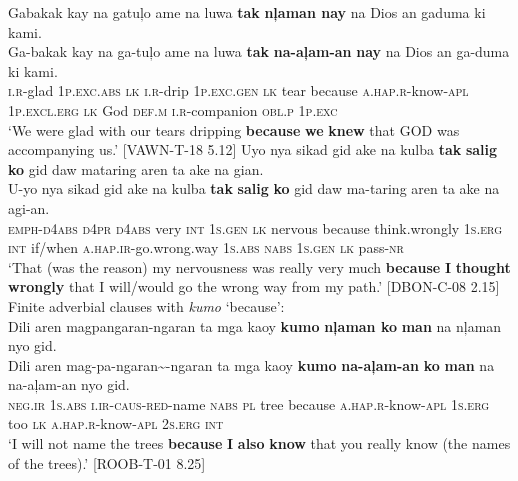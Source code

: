 \newpage
\ea
Gabakak  kay  na  gatuļo  ame  na  luwa  \textbf{tak} \textbf{nļaman  nay} na  Dios  an  gaduma  ki  kami. \smallskip\\
\gll Ga-bakak  kay  na  ga-tuļo  ame  na  luwa  \textbf{tak} \textbf{na-aļam-an}  \textbf{nay} na  Dios  an  ga-duma  ki  kami. \\
\textsc{i.r}-glad  1\textsc{p.exc.abs}  \textsc{lk}  \textsc{i.r}-drip  1\textsc{p.exc.gen}  \textsc{lk}  tear  because
\textsc{a.hap.r}-know-\textsc{apl}  1\textsc{p.excl.erg}  \textsc{lk}  God  \textsc{def.m}  \textsc{i.r}-companion  \textsc{obl.p}  1\textsc{p.exc} \\
\glt `We were glad with our tears dripping \textbf{because} \textbf{we} \textbf{knew} that GOD was accompanying us.’ [VAWN-T-18 5.12]
\z
\ea
Uyo   nya  sikad  gid  ake  na  kulba  \textbf{tak}  \textbf{salig} \textbf{ko}  gid  daw  mataring  aren  ta  ake  na  gian. \smallskip\\
\gll U-yo   nya  sikad  gid  ake  na  kulba  \textbf{tak}  \textbf{salig} \textbf{ko}  gid  daw  ma-taring  aren  ta  ake  na  agi-an. \\
\textsc{emph-d4abs} \textsc{d4pr}  \textsc{d}4\textsc{abs}  very  \textsc{int}  1\textsc{s.gen}  \textsc{lk}  nervous  because  think.wrongly
1\textsc{s.erg}  \textsc{int}  if/when  \textsc{a.hap.ir}-go.wrong.way  1\textsc{s.abs}  \textsc{nabs}  1\textsc{s.gen}  \textsc{lk}  pass-\textsc{nr} \\
\glt `That (was the reason) my nervousness was really very much \textbf{because} \textbf{I} \textbf{thought} \textbf{wrongly} that I will/would go the wrong way from my path.’ [DBON-C-08 2.15]
\z
\ea
Finite adverbial clauses with \textit{kumo} ‘because’: \\
Dili  aren  magpangaran-ngaran  ta  mga  kaoy \textbf{kumo}  \textbf{nļaman  ko}  \textbf{man}  na  nļaman  nyo  gid. \smallskip\\
\gll Dili  aren  mag-pa-ngaran\sim{}-ngaran  ta  mga  kaoy \textbf{kumo}  \textbf{na-aļam-an}  \textbf{ko}  \textbf{man}  na  na-aļam-an  nyo  gid. \\
\textsc{neg.ir}  1\textsc{s.abs}  \textsc{i.ir}-\textsc{caus}-\textsc{red}-name  \textsc{nabs}  \textsc{pl}  tree
because  \textsc{a.hap.r}-know-\textsc{apl}  1\textsc{s.erg}  too  \textsc{lk}  \textsc{a.hap.r}-know-\textsc{apl}  2\textsc{s.erg}  \textsc{int} \\
\glt `I will not name the trees \textbf{because} \textbf{I} \textbf{also} \textbf{know} that you really know (the names of the  trees).’ [ROOB-T-01 8.25]
